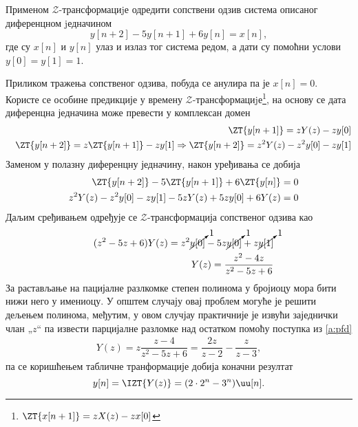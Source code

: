 \PID 
Применом $\mathcal{Z}$-трансформациjе одредити сопствени одзив система описаног диференцном jедначином
$$
    y[n+2] - 5 y[n + 1] + 6 y[n] = x[n],
$$
где су $x[n]$ и $y[n]$ улаз и излаз тог система редом, а дати су помоћни услови $y[0] = y[1] = 1$.

\RESENJE

Приликом тражења сопственог одзива, побуда се анулира па је $x[n] = 0$.
Користе се особине предикције у времену $\mathcal{Z}$-трансформациjе\footnote{
    $\ZT{x[n+1]} = z X(z) - z x[0]$
}, на основу се дата диференцна једначина може превести у комплексан домен 
\begin{eqnarray}
    &&
    \ZT{y[n+1]} = z Y(z) - z y[0] 
    \\
    &&
    \ZT{y[n+2]} = z \ZT{y[n+1]}  - z y[1] 
    \Rightarrow
    \ZT{y[n+2]} = z^2 Y(z) - z^2 y[0]  - z y[1] 
\end{eqnarray}
Заменом у полазну диференцну једначину, након уређивања се добија 
\begin{eqnarray}
    && 
    \ZT{y[n+2]} - 5 \ZT{y[n + 1]} + 6 \ZT{y[n]} = 0 \\
    && 
    z^2 Y(z) - z^2 y[0]  - z y[1] 
    -5z Y(z) + 5z y[0]
    + 6 Y(z) = 0 \\
\end{eqnarray}
Даљим сређивањем одређује се $\mathcal{Z}$-трансформација сопственог одзива као
\begin{eqnarray}
    && (z^2 - 5z + 6) Y(z) = z^2 \cancelto{1}{y[0]} - 5z \cancelto{1}{y[0]} + z \cancelto{1}{y[1]}  \\
    && Y(z) = \dfrac{z^2 - 4z}{z^2 - 5z + 6}
\end{eqnarray}
За растављање на пацијалне разлкомке степен полинома у бројиоцу мора бити нижи него у имениоцу. У општем случају овај проблем 
могуће је решити дељењем полинома, међутим, у овом случјау практичније је извући заједнички члан „$z$“ па извести парцијалне разломке 
над остатком помоћу поступка из \ref{a:pfd}
\begin{eqnarray}
    Y(z) = z \dfrac{z - 4}{z^2 - 5z + 6} = \dfrac{2z}{z - 2} - \dfrac{z}{z - 3},
\end{eqnarray}
па се коришћењем табличне транформације  добија коначни резултат 
\begin{equation}
    y[n] = \IZT{Y(z)} = (2 \cdot 2^n - 3^n) \uu[n].
\end{equation}